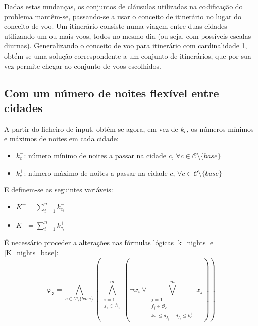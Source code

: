 \documentclass[12pt,a4paper]{article}
\begin{document}
        Dadas estas mudanças, os conjuntos de cláusulas utilizadas na codificação do problema mantêm-se, passando-se a usar o conceito de itinerário no lugar do conceito de voo. Um itinerário consiste numa viagem entre duas cidades utilizando um ou mais voos, todos no mesmo dia (ou seja, com possíveis escalas diurnas). Generalizando o conceito de voo para itinerário com cardinalidade 1, obtém-se uma solução correspondente a um conjunto de itinerários, que por sua vez permite chegar ao conjunto de voos escolhidos.

    \newpage

    \subsection{Com um número de noites flexível entre cidades}
        A partir do ficheiro de input, obtêm-se agora, em vez de $k_c$, os números mínimos e máximos de noites em cada cidade:
        \begin{itemize}
            \item $k_c^-$: número mínimo de noites a passar na cidade $c$, $\forall c \in \mathcal{C} \setminus \{base\}$
            \item $k_c^+$: número máximo de noites a passar na cidade $c$, $\forall c \in \mathcal{C} \setminus \{base\}$
        \end{itemize}
        E definem-se as seguintes variáveis:
        \begin{itemize}
            \item $K^- = \sum_{i = 1}^{n}{k_{c_i}^-}$
            \item $K^+ = \sum_{i = 1}^{n}{k_{c_i}^+}$
        \end{itemize}
        É necessário proceder a alterações nas fórmulas lógicas \ref{k_nights} e \ref{K_nights_base}:
        \begin{equation}
            \varphi_3 =
            \bigwedge_{c \in \mathcal{C} \setminus \{base\}}
            \left(
            \bigwedge_{\substack{i = 1 \\
                                 f_i \in \mathcal{D}_c}}
                     ^{m}
            \left(
            \neg x_i \lor
            \bigvee_{\substack{j = 1 \\
                               f_j \in \mathcal{O}_c \\
                               k_c^- \leq d_{f_j} - d_{f_i} \leq k_c^+}}
                ^{m}
                {x_j}
            \right)
            \right)
            \label{k_nights_var}
        \end{equation}
\end{document}
